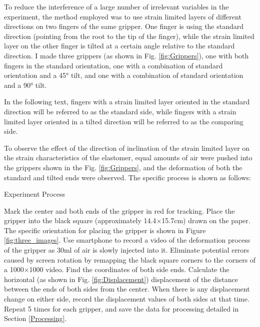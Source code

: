 \documentclass[conference]{IEEEtran}
\begin{document}
To reduce the interference of a large number of irrelevant variables in the experiment, the method employed was to use strain limited layers of different directions on two fingers of the same gripper. One finger is using the standard direction (pointing from the root to the tip of the finger), while the strain limited layer on the other finger is tilted at a certain angle relative to the standard direction. I made three grippers (as shown in Fig. \ref{fig:Grippers}), one with both fingers in the standard orientation, one with a combination of standard orientation and a 45° tilt, and one with a combination of standard orientation and a 90° tilt. 

In the following text, fingers with a strain limited layer oriented in the standard direction will be referred to as the standard side, while fingers with a strain limited layer oriented in a tilted direction will be referred to as the comparing side.

To observe the effect of the direction of inclination of the strain limited layer on the strain characteristics of the elastomer, equal amounts of air were pushed into the grippers shown in the Fig. \ref{fig:Grippers}, and the deformation of both the standard and tilted ends were observed. The specific process is shown as follows:

\begin{algorithm}
\label{Algorithm}
	\caption{Experiment Process}\label{pseudo:ExperimentProcess}
	\begin{algorithmic}[1]
            \State Mark the center and both ends of the gripper in red for tracking.
            \State Place the gripper into the black square (approximately 14.4$\times$15.7cm) drawn on the paper. The specific orientation for placing the gripper is shown in Figure \ref{fig:three_images}.
            \State Use smartphone to record a video of the deformation process of the gripper as 30ml of air is slowly injected into it.
            \State Eliminate potential errors caused by screen rotation by remapping the black square corners to the corners of a 1000$\times$1000 video. 
            \State Find the coordinates of both side ends.
            \State Calculate the horizontal (as shown in Fig. \ref{fig:Displacement}) displacement of the distance between the ends of both sides from the center.
            \State When there is any displacement change on either side, record the displacement values of both sides at that time.
            \State Repeat 5 times for each gripper, and save the data for processing detailed in Section \ref{Processing}.
	\end{algorithmic} 
\end{algorithm}
\end{document}
